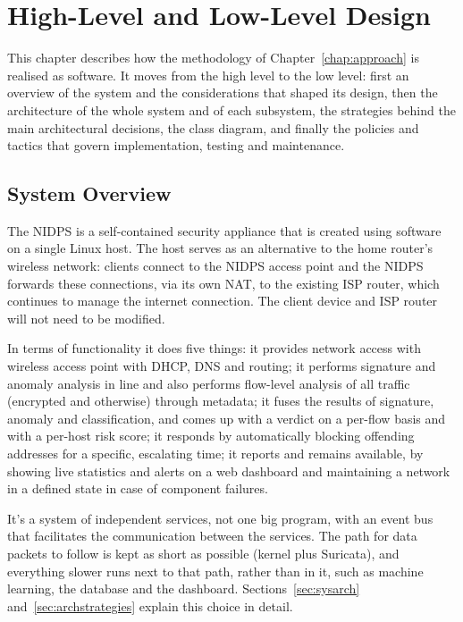 \chapter{High-Level and Low-Level Design}\label{chap:6}
\label{chap:design}
\noindent This chapter describes how the methodology of Chapter~\ref{chap:approach} is realised as software. It moves from the high level to the low level: first an overview of the system and the considerations that shaped its design, then the architecture of the whole system and of each subsystem, the strategies behind the main architectural decisions, the class diagram, and finally the policies and tactics that govern implementation, testing and maintenance.

\section{System Overview}\label{sec:6.1}
\label{sec:sysoverview}
\noindent The NIDPS is a self-contained security appliance that is created using software on a single Linux host. The host serves as an alternative to the home router's wireless network: clients connect to the NIDPS access point and the NIDPS forwards these connections, via its own NAT, to the existing ISP router, which continues to manage the internet connection. The client device and ISP router will not need to be modified.

\noindent In terms of functionality it does five things: it provides network access with wireless access point with DHCP, DNS and routing; it performs signature and anomaly analysis in line and also performs flow-level analysis of all traffic (encrypted and otherwise) through metadata; it fuses the results of signature, anomaly and classification, and comes up with a verdict on a per-flow basis and with a per-host risk score; it responds by automatically blocking offending addresses for a specific, escalating time; it reports and remains available, by showing live statistics and alerts on a web dashboard and maintaining a network in a defined state in case of component failures.

\noindent It's a system of independent services, not one big program, with an event bus that facilitates the communication between the services. The path for data packets to follow is kept as short as possible (kernel plus Suricata), and everything slower runs next to that path, rather than in it, such as machine learning, the database and the dashboard. Sections~\ref{sec:sysarch} and~\ref{sec:archstrategies} explain this choice in detail.

